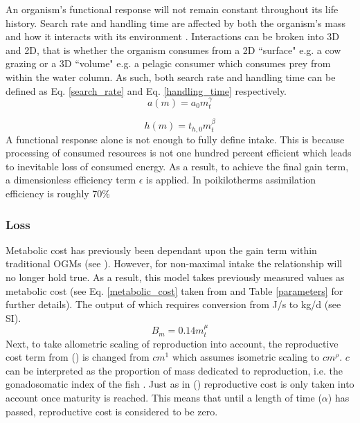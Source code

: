 \documentclass[a4paper, 11pt, hidelinks]{article} %
\begin{document}
	An organism's functional response will not remain constant throughout its life history.  Search rate and handling time are affected by both the organism's mass and how it interacts with its environment \parencite{Pawar2012}.  
	Interactions can be broken into 3D and 2D, that is whether the organism consumes from a 2D ``surface" e.g. a cow grazing or a 3D ``volume" e.g. a pelagic consumer which consumes prey from within the water column.  As such, both search rate and handling time can be defined as Eq. \ref{search_rate} and Eq. \ref{handling_time} respectively.
	\begin{equation}
		\label{search_rate}
		a(m) = a_0 m_t^\gamma
	\end{equation}
	
	\begin{equation}
		\label{handling_time}
		h(m) = t_{h,0} m_t^\beta
	\end{equation}
	A functional response alone is not enough to fully define intake.  This is because processing of consumed resources is not one hundred percent efficient which leads to inevitable loss of consumed energy.  As a result, to achieve the final gain term, a dimensionless efficiency term $\epsilon$ is applied.  In poikilotherms assimilation efficiency is roughly 70\% \parencite{Peters1983}
	
	\subsubsection{Loss}
	Metabolic cost  has previously been dependant upon the gain term within traditional OGMs (see \cite{West2001, Hou2008}).  However, for non-maximal intake the relationship will no longer hold true.  As a result, this model takes previously measured values as metabolic cost (see Eq. \ref{metabolic_cost} taken from \cite{Peters1983} %
	and Table \ref{parameters} for further details).  The output of which requires conversion from J/s to kg/d (see SI).
	\begin{equation}
		\label{metabolic_cost}
		B_m = 0.14 m_t^\mu
	\end{equation}
	Next, to take allometric scaling of reproduction into account, the reproductive cost term from \citeauthor{Charnov2001} (\citeyear{Charnov2001}) is changed from $cm^1$ which assumes isometric scaling to $cm^\rho$.  $c$ can be interpreted as the proportion of mass dedicated to reproduction, i.e. the gonadosomatic index of the fish \parencite{Charnov2001}.  Just as in \citeauthor{Charnov2001} (\citeyear{Charnov2001}) reproductive cost is only taken into account once maturity is reached.  This means that until a length of time ($\alpha$) has passed, reproductive cost is considered to be zero.
	
\end{document}
